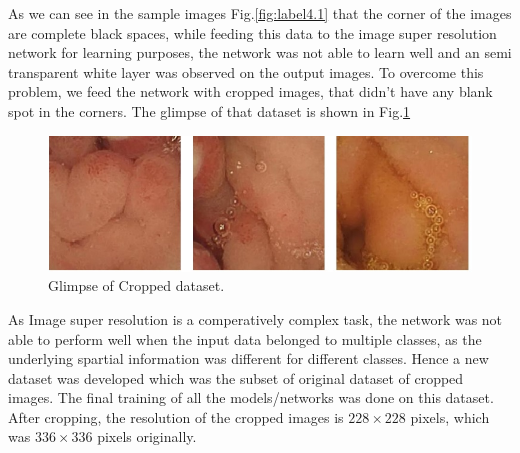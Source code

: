 \newpage
As we can see in the sample images Fig.\ref{fig:label4.1} that the corner of the images are complete black spaces, while feeding this data to the image super resolution network for learning purposes, the network was not able to learn well and an semi transparent white layer was observed on the output images. To overcome this problem, we feed the network with cropped images, that didn't have any blank spot in the corners.
The glimpse of that dataset is shown in Fig.\ref{fig:label4.2}
\begin{figure}[h]
    \centering
    \includegraphics[totalheight=1.5in]{Chapter4/Fig4.2.jpg}
    \caption[Glimpse of Cropped dataset]{Glimpse of Cropped dataset.\cite{data}}
    \label{fig:label4.2}
\end{figure}
\newline
As Image super resolution is a comperatively complex task, the network was not able to perform well when the input data belonged to multiple classes, as the underlying spartial information was different for different classes. Hence a new dataset was developed which was the subset of original dataset of cropped images.
The final training of all the models/networks was done on this dataset. After cropping, the resolution of the cropped images is $228 \times 228$ pixels, which was $336 \times 336$ pixels originally.